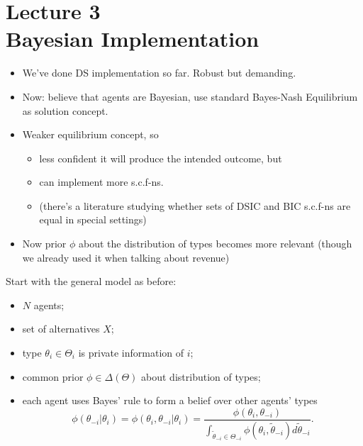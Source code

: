 \documentclass[english,handout,10pt]{beamer}		%
\def\lyxframeend{} %
\begin{document}
\section{Lecture 3 \\ Bayesian Implementation}

\begin{itemize}
	\item We've done DS implementation so far. Robust but demanding.
	\item Now: believe that agents are Bayesian, use standard Bayes-Nash Equilibrium as solution concept.
	\pause
	\item Weaker equilibrium concept, so
	\begin{itemize}
		\item less confident it will produce the intended outcome, but
		\item can implement more s.c.f-ns. 
		\item (there's a literature studying whether sets of DSIC and BIC s.c.f-ns are equal in special settings)
	\end{itemize}
	\item Now prior $\phi$ about the distribution of types becomes more relevant (though we already used it when talking about revenue)
\end{itemize}
\lyxframeend


Start with the general model as before:
\begin{itemize}
	\item $N$ agents;
	\item set of alternatives $X$;
	\item type $\theta_{i}\in\Theta_{i}$ is private information of $i$;
	\item common prior $\phi \in \varDelta(\Theta)$ about distribution of types;
	\item each agent uses Bayes' rule to form a belief over other agents' types\\
	$$\phi(\theta_{-i}|\theta_{i}) = \phi(\theta_{i},\theta_{-i}|\theta_{i}) = \frac{\phi(\theta_{i}, \theta_{-i}) }{\int_{\tilde\theta_{-i}\in\Theta_{-i}} \phi(\theta_{i},\tilde\theta_{-i}) d\tilde{\theta}_{-i}}.$$
\end{itemize}
\lyxframeend
\end{document}
